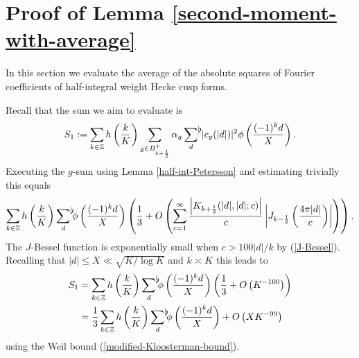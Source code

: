 \documentclass[a4paper,10pt,twoside]{amsart}
\theoremstyle{definition}
\numberwithin{equation}{section}
\newcommand\Z{\mathbb{Z}}
\renewcommand\:{\colon}
\newcommand{\sumflat}{\mathop{{\sum}^{\raisebox{-3pt}{\makebox[0pt][l]{$\flat$}}}}}
\begin{document}
\section{Proof of Lemma \ref{second-moment-with-average}}

\noindent In this section we evaluate the average of the absolute squares of Fourier coefficients of half-integral weight Hecke cusp forms. 

Recall that the sum we aim to evaluate is
\[S_1:=\sum_{k\in\Z}h\left(\frac{k}K\right)\sum_{g\in B_{k+\frac12}^+}\alpha_g\sumflat_d\,|c_g(|d|)|^2\phi\left(\frac{(-1)^k d}X\right).\]
Executing the $g$-sum using Lemma \ref{half-int-Petersson} and estimating trivially this equals
\[ 
\sum_{k\in\Z}h\left(\frac kK\right)\sumflat_d\phi\left(\frac{(-1)^k d}X\right)\left(\frac13+O\left(\sum_{c=1}^\infty\frac{\left|K_{k+\frac12}(|d|,|d|;c)\right|}c\left|J_{k-\frac12}\left(\frac{4\pi|d|}c\right)\right|\right)\right).\]
The $J$-Bessel function is exponentially small when $c>100|d|/k$ by (\ref{J-Bessel}). Recalling that $|d|\leq X\ll\sqrt{K/\log K}$ and $k\asymp K$ this leads to
\begin{align*}
S_1&=\sum_{k\in\mathbb Z}h\left(\frac{k}K\right)\sumflat_d\phi\left(\frac{(-1)^kd}X\right)\left(\frac13+O\left(K^{-100}\right)\right)\\
&=\frac13\sum_{k\in\mathbb Z}h\left(\frac{k}K\right)\sumflat_d\phi\left(\frac{(-1)^kd}X\right)+O\left(XK^{-99}\right)
\end{align*}
using the Weil bound (\ref{modified-Kloosterman-bound}).
\end{document}
